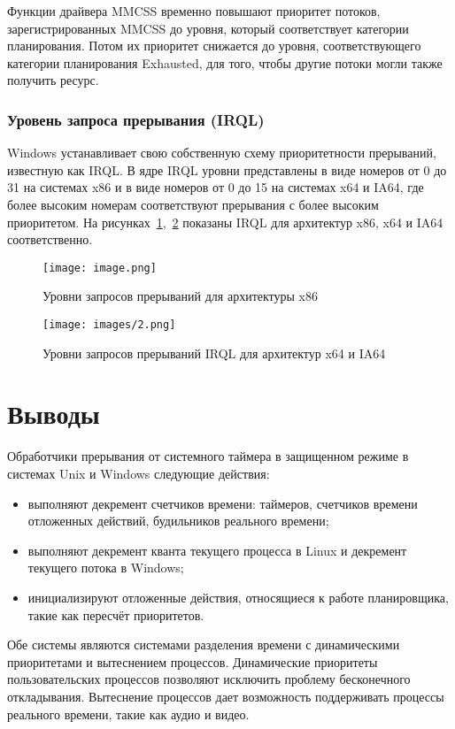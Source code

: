 Функции драйвера MMCSS временно повышают приоритет потоков, зарегистрированных MMCSS до уровня, который соответствует категории планирования. Потом их приоритет снижается до уровня, соответствующего категории планирования Exhausted, для того, чтобы другие потоки могли также получить ресурс.

\subsection{Уровень запроса прерывания (IRQL)}

Windows устанавливает свою собственную схему приоритетности прерываний,
известную как IRQL. В ядре IRQL уровни представлены в виде номеров от 0 до 31 на
системах x86 и в виде номеров от 0 до 15 на системах x64 и IA64, где более высоким номерам
соответствуют прерывания с более высоким приоритетом. На рисунках~\ref{fig:IRQL_levels},~\ref{fig:IRQL_LEVELS2} показаны IRQL
для архитектур x86, x64 и IA64 соответственно.

\begin{figure}[H]
    \centering
    \texttt{[image: image.png]}
    \caption{Уровни запросов прерываний для архитектуры x86}
    \label{fig:IRQL_levels}
\end{figure}

\begin{figure}[H]
    \centering
    \texttt{[image: images/2.png]}
    \caption{Уровни запросов прерываний IRQL для архитектур x64 и IA64}
    \label{fig:IRQL_LEVELS2}
\end{figure}
\chapter{Выводы}

Обработчики прерывания от системного таймера в защищенном режиме в системах Unix и Windows следующие действия:
\begin{itemize}
    \item выполняют декремент счетчиков времени: таймеров, счетчиков времени отложенных действий, будильников реального времени;
\item выполняют декремент кванта текущего процесса в Linux и декремент текущего
потока в Windows;
\item инициализируют отложенные действия, относящиеся к работе планировщика, такие
как пересчёт приоритетов.
\end{itemize}

Обе системы являются системами разделения времени с динамическими приоритетами
и вытеснением процессов. Динамические приоритеты пользовательских процессов позволяют исключить проблему бесконечного откладывания. Вытеснение процессов дает возможность поддерживать процессы реального времени, такие как аудио и видео.